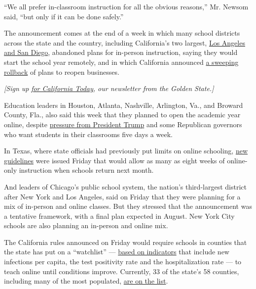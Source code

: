 ``We all prefer in-classroom instruction for all the obvious reasons,''
Mr. Newsom said, ``but only if it can be done safely.''

The announcement comes at the end of a week in which many school
districts across the state and the country, including California's two
largest,
\href{https://www.nytimes3xbfgragh.onion/2020/07/13/us/lausd-san-diego-school-reopening.html}{Los
Angeles and San Diego}, abandoned plans for in-person instruction,
saying they would start the school year remotely, and in which
California announced
\href{https://www.nytimes3xbfgragh.onion/2020/07/14/us/california-counties-reopening.html}{a
sweeping rollback} of plans to reopen businesses.

\emph{{[}Sign up}
\href{https://www.nytimes3xbfgragh.onion/newsletters/california-today}{\emph{for
California Today}}\emph{, our newsletter from the Golden State.{]}}

Education leaders in Houston, Atlanta, Nashville, Arlington, Va., and
Broward County, Fla., also said this week that they planned to open the
academic year online, despite
\href{https://www.nytimes3xbfgragh.onion/2020/07/14/us/coronavirus-schools-fall.html}{pressure
from President Trump} and some Republican governors who want students in
their classrooms five days a week.

In Texas, where state officials had previously put limits on online
schooling, \href{https://pbs.twimg.com/media/EdI6_hZWkAAG24Y.jpg}{new
guidelines} were issued Friday that would allow as many as eight weeks
of online-only instruction when schools return next month.

And leaders of Chicago's public school system, the nation's
third-largest district after New York and Los Angeles, said on Friday
that they were planning for a mix of in-person and online classes. But
they stressed that the announcement was a tentative framework, with a
final plan expected in August. New York City schools are also planning
an in-person and online mix.

The California rules announced on Friday would require schools in
counties that the state has put on a ``watchlist'' ---
\href{https://www.cdph.ca.gov/Programs/CID/DCDC/Pages/COVID-19/COVID19CountyDataTable.aspx}{based
on indicators} that include new infections per capita, the test
positivity rate and the hospitalization rate --- to teach online until
conditions improve. Currently, 33 of the state's 58 counties, including
many of the most populated,
\href{https://www.cdph.ca.gov/Programs/CID/DCDC/Pages/COVID-19/CountyMonitoringDataStep2.aspx}{are
on the list}.

